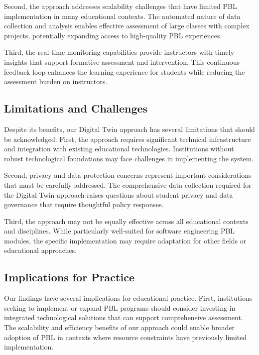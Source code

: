 \documentclass[review]{elsarticle}
\begin{document}
Second, the approach addresses scalability challenges that have limited PBL implementation in many educational contexts. The automated nature of data collection and analysis enables effective assessment of large classes with complex projects, potentially expanding access to high-quality PBL experiences.

Third, the real-time monitoring capabilities provide instructors with timely insights that support formative assessment and intervention. This continuous feedback loop enhances the learning experience for students while reducing the assessment burden on instructors.

\subsection{Limitations and Challenges}
\label{sec:limitations}

Despite its benefits, our Digital Twin approach has several limitations that should be acknowledged. First, the approach requires significant technical infrastructure and integration with existing educational technologies. Institutions without robust technological foundations may face challenges in implementing the system.

Second, privacy and data protection concerns represent important considerations that must be carefully addressed. The comprehensive data collection required for the Digital Twin approach raises questions about student privacy and data governance that require thoughtful policy responses.

Third, the approach may not be equally effective across all educational contexts and disciplines. While particularly well-suited for software engineering PBL modules, the specific implementation may require adaptation for other fields or educational approaches.

\subsection{Implications for Practice}
\label{sec:implications}

Our findings have several implications for educational practice. First, institutions seeking to implement or expand PBL programs should consider investing in integrated technological solutions that can support comprehensive assessment. The scalability and efficiency benefits of our approach could enable broader adoption of PBL in contexts where resource constraints have previously limited implementation.
\end{document}
